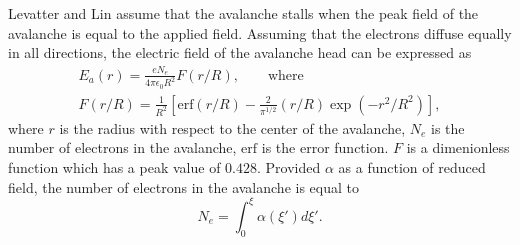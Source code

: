 Levatter and Lin assume that the avalanche stalls when the peak field of the
avalanche is equal to the applied field. Assuming that the electrons diffuse
equally in all directions, the electric field of the avalanche head can be
expressed as
\begin{eqnarray}
  E_a(r) = \frac{eN_e}{4\pi\epsilon_0R^2} F(r/R), \qquad \mathrm{where} \\
  F(r/R) = \frac{1}{R^2}\left[\mathrm{erf}(r/R)-\frac{2}{\pi^{1/2}}
           (r/R)\exp(-r^2/R^2)\right] ,
\end{eqnarray}
where $r$ is the radius with respect to the center of the avalanche, $N_e$ is
the number of electrons in the avalanche, $\mathrm{erf}$ is the error function.
$F$ is a dimenionless function which has a peak value of $0.428$. Provided
$\alpha$ as a function of reduced field, the number of electrons in the
avalanche is equal to 
\begin{equation}
  N_e = \int_0^\xi \alpha(\xi')d\xi'.
  \label{eq:s_pop}
\end{equation}

